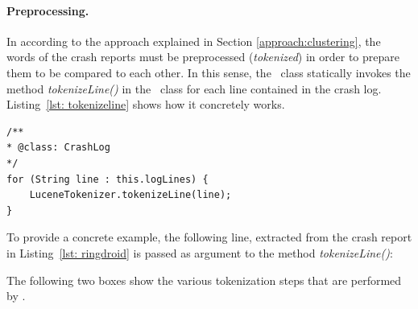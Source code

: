 \paragraph{Preprocessing.}
In according to the approach explained in Section \ref{approach:clustering}, the words of the crash reports must be preprocessed (\textit{tokenized}) in order to prepare them to be compared to each other. 
In this sense, the \Crash\ class statically invokes the method \textit{tokenizeLine()} in the \Lucene\ class for each line contained in the crash log. Listing~\ref{lst: tokenizeline} shows how it concretely works. 
\clearpage

\begin{lstlisting}[caption=Each line inside the crash report is tokenized using \Lucene,label={lst: tokenizeline}]
/**
* @class: CrashLog
*/
for (String line : this.logLines) {
	LuceneTokenizer.tokenizeLine(line);
}
\end{lstlisting} 
To provide a concrete example, the following line, extracted from the crash report in Listing~\ref{lst: ringdroid} is passed as argument to the method \textit{tokenizeLine()}: \vspace{-0.8cm}
\begin{center}
 \par
\end{center}
The following two boxes show the various tokenization steps that are performed by \toolname.
